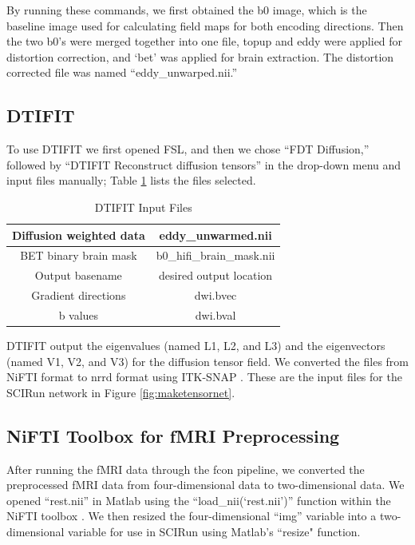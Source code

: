 By running these commands, we first obtained the b0 image, which is the baseline image used for calculating field maps for both encoding directions. Then the two b0's were merged together into one file, topup and eddy were applied for distortion correction, and `bet' was applied for brain extraction. The distortion corrected file was named ``eddy\_unwarped.nii.''

\subsection{DTIFIT}
\label{sec:dtifit}

To use DTIFIT we first opened FSL, and then we chose ``FDT Diffusion,'' followed by ``DTIFIT Reconstruct diffusion tensors'' in the drop-down menu and input files manually; Table \ref{tab:dtifit} lists the files selected.

\begin{table}[H]
\centering
\caption{DTIFIT Input Files}
\label{tab:dtifit}
\begin{tabular}{|c|c|}
\hline
Diffusion weighted data & eddy\_unwarmed.nii        \\ \hline
BET binary brain mask   & b0\_hifi\_brain\_mask.nii \\ \hline
Output basename          & desired output location   \\ \hline
Gradient directions     & dwi.bvec                  \\ \hline
b values                & dwi.bval                  \\ \hline
\end{tabular}
\end{table}

DTIFIT output the eigenvalues (named L1, L2, and L3) and the eigenvectors (named V1, V2, and V3) for the diffusion tensor field. We converted the files from NiFTI format to nrrd format using ITK-SNAP \cite{ref:itksnap}. These are the input files for the SCIRun network in Figure \ref{fig:maketensornet}.

\subsection{NiFTI Toolbox for fMRI Preprocessing}
\label{sec:nifti}

After running the fMRI data through the fcon pipeline, we converted the preprocessed fMRI data from four-dimensional data to two-dimensional data. We opened ``rest.nii'' in Matlab using the ``load\_nii(`rest.nii')'' function within the NiFTI toolbox \cite{ref:nifti}. We then resized the four-dimensional ``img'' variable into a two-dimensional variable for use in SCIRun using Matlab's ``resize" function.

